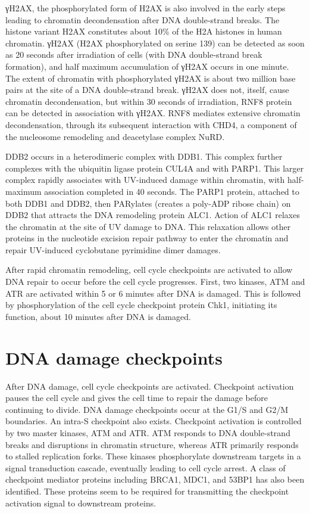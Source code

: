 γH2AX, the phosphorylated form of H2AX is also involved in the early steps leading to chromatin decondensation after DNA double-strand breaks. The histone variant H2AX constitutes about 10\% of the H2A histones in human chromatin. γH2AX (H2AX phosphorylated on serine 139) can be detected as soon as 20 seconds after irradiation of cells (with DNA double-strand break formation), and half maximum accumulation of γH2AX occurs in one minute. The extent of chromatin with phosphorylated γH2AX is about two million base pairs at the site of a DNA double-strand break. γH2AX does not, itself, cause chromatin decondensation, but within 30 seconds of irradiation, RNF8 protein can be detected in association with γH2AX. RNF8 mediates extensive chromatin decondensation, through its subsequent interaction with CHD4, a component of the nucleosome remodeling and deacetylase complex NuRD.

DDB2 occurs in a heterodimeric complex with DDB1. This complex further complexes with the ubiquitin ligase protein CUL4A and with PARP1. This larger complex rapidly associates with UV-induced damage within chromatin, with half-maximum association completed in 40 seconds. The PARP1 protein, attached to both DDB1 and DDB2, then PARylates (creates a poly-ADP ribose chain) on DDB2 that attracts the DNA remodeling protein ALC1. Action of ALC1 relaxes the chromatin at the site of UV damage to DNA. This relaxation allows other proteins in the nucleotide excision repair pathway to enter the chromatin and repair UV-induced cyclobutane pyrimidine dimer damages.

After rapid chromatin remodeling, cell cycle checkpoints are activated to allow DNA repair to occur before the cell cycle progresses. First, two kinases, ATM and ATR are activated within 5 or 6 minutes after DNA is damaged. This is followed by phosphorylation of the cell cycle checkpoint protein Chk1, initiating its function, about 10 minutes after DNA is damaged.

\hypertarget{dna-damage-checkpoints}{%
\section{DNA damage checkpoints}\label{dna-damage-checkpoints}}

After DNA damage, cell cycle checkpoints are activated. Checkpoint activation pauses the cell cycle and gives the cell time to repair the damage before continuing to divide. DNA damage checkpoints occur at the G1/S and G2/M boundaries. An intra-S checkpoint also exists. Checkpoint activation is controlled by two master kinases, ATM and ATR. ATM responds to DNA double-strand breaks and disruptions in chromatin structure, whereas ATR primarily responds to stalled replication forks. These kinases phosphorylate downstream targets in a signal transduction cascade, eventually leading to cell cycle arrest. A class of checkpoint mediator proteins including BRCA1, MDC1, and 53BP1 has also been identified. These proteins seem to be required for transmitting the checkpoint activation signal to downstream proteins.

